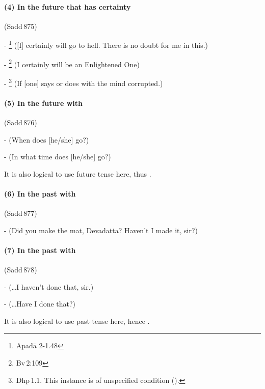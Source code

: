 \paragraph*{(4) In the future that has certainty} (Sadd\,875)\par
- \footnote{Apad\=a 2-1.48} ([I] certainly will go to hell. There is no doubt for me in this.)\par
- \footnote{Bv\,2:109} (I certainly will be an Enlightened One)\par
- \footnote{Dhp\,1.1. This instance is of unspecified condition ().} (If [one] says or does with the mind corrupted.)\par

\paragraph*{(5) In the future with } (Sadd\,876)\par
-  (When does [he/she] go?)\par
-  (In what time does [he/she] go?)\par
It is also logical to use future tense here, thus .

\paragraph*{(6) In the past with } (Sadd\,877)\par
-  (Did you make the mat, Devadatta? Haven't I made it, sir?)\par

\paragraph*{(7) In the past with } (Sadd\,878)\par
-  (\ldots I haven't done that, sir.)\par
-  (\ldots Have I done that?)\par
It is also logical to use past tense here, hence .

